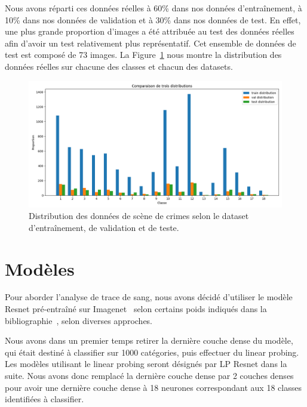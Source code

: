 \documentclass[a4paper]{article}
\begin{document}
Nous avons réparti ces données réelles à 60\% dans nos données d'entraînement, à 10\% dans nos données de validation et à 30\% dans nos données de test. En effet, une plus grande proportion d'images a été attribuée au test des données réelles afin d'avoir un test relativement plus représentatif. Cet ensemble de données de test est composé de 73 images. La Figure~\ref{fig:distribution real} nous montre la distribution des données réelles sur chacune des classes et chacun des datasets.

\begin{figure}[H]
    \centering
    \includegraphics[width=0.8\linewidth]{../asset/distribution_train_val_test.png}
    \caption{Distribution des données de scène de crimes selon le dataset d'entraînement, de validation et de teste.}
    \label{fig:distribution real}
\end{figure}



\section{Modèles}

Pour aborder l'analyse de trace de sang, nous avons décidé d'utiliser le modèle Resnet pré-entraîné sur Imagenet~\cite{DBLP:journals/corr/HeZRS15} selon certains poids indiqués dans la bibliographie~\cite{torchvision2016}, selon diverses approches.


Nous avons dans un premier temps retirer la dernière couche dense du modèle, qui était destiné à classifier sur 1000 catégories, puis effectuer du linear probing. Les modèles utilisant le linear probing seront désignés par LP Resnet dans la suite. Nous avons donc remplacé la dernière couche dense par 2 couches denses pour avoir une dernière couche dense à 18 neurones correspondant aux 18 classes identifiées à classifier. 
\end{document}
